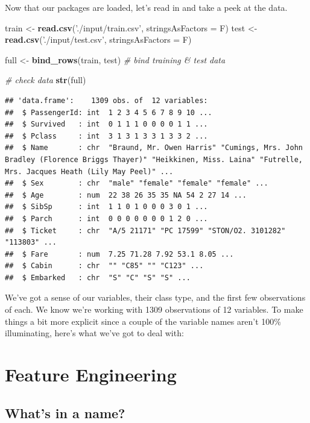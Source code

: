 \documentclass[]{book}
\newenvironment{Shaded}{\begin{snugshade}}{\end{snugshade}}
\newcommand{\KeywordTok}[1]{\textcolor[rgb]{0.13,0.29,0.53}{\textbf{#1}}}
\newcommand{\DataTypeTok}[1]{\textcolor[rgb]{0.13,0.29,0.53}{#1}}
\newcommand{\StringTok}[1]{\textcolor[rgb]{0.31,0.60,0.02}{#1}}
\newcommand{\CommentTok}[1]{\textcolor[rgb]{0.56,0.35,0.01}{\textit{#1}}}
\newcommand{\NormalTok}[1]{#1}
\theoremstyle{definition}
\theoremstyle{definition}
\theoremstyle{definition}
\theoremstyle{remark}
\begin{document}
Now that our packages are loaded, let's read in and take a peek at the
data.

\begin{Shaded}
\begin{Highlighting}[]
\NormalTok{train <-}\StringTok{ }\KeywordTok{read.csv}\NormalTok{(}\StringTok{'./input/train.csv'}\NormalTok{, }\DataTypeTok{stringsAsFactors =}\NormalTok{ F)}
\NormalTok{test  <-}\StringTok{ }\KeywordTok{read.csv}\NormalTok{(}\StringTok{'./input/test.csv'}\NormalTok{, }\DataTypeTok{stringsAsFactors =}\NormalTok{ F)}

\NormalTok{full  <-}\StringTok{ }\KeywordTok{bind_rows}\NormalTok{(train, test) }\CommentTok{# bind training & test data}

\CommentTok{# check data}
\KeywordTok{str}\NormalTok{(full)}
\end{Highlighting}
\end{Shaded}

\begin{verbatim}
## 'data.frame':    1309 obs. of  12 variables:
##  $ PassengerId: int  1 2 3 4 5 6 7 8 9 10 ...
##  $ Survived   : int  0 1 1 1 0 0 0 0 1 1 ...
##  $ Pclass     : int  3 1 3 1 3 3 1 3 3 2 ...
##  $ Name       : chr  "Braund, Mr. Owen Harris" "Cumings, Mrs. John Bradley (Florence Briggs Thayer)" "Heikkinen, Miss. Laina" "Futrelle, Mrs. Jacques Heath (Lily May Peel)" ...
##  $ Sex        : chr  "male" "female" "female" "female" ...
##  $ Age        : num  22 38 26 35 35 NA 54 2 27 14 ...
##  $ SibSp      : int  1 1 0 1 0 0 0 3 0 1 ...
##  $ Parch      : int  0 0 0 0 0 0 0 1 2 0 ...
##  $ Ticket     : chr  "A/5 21171" "PC 17599" "STON/O2. 3101282" "113803" ...
##  $ Fare       : num  7.25 71.28 7.92 53.1 8.05 ...
##  $ Cabin      : chr  "" "C85" "" "C123" ...
##  $ Embarked   : chr  "S" "C" "S" "S" ...
\end{verbatim}

We've got a sense of our variables, their class type, and the first few
observations of each. We know we're working with 1309 observations of 12
variables. To make things a bit more explicit since a couple of the
variable names aren't 100\% illuminating, here's what we've got to deal
with:

\section{Feature Engineering}\label{feature-engineering}

\subsection{What's in a name?}\label{whats-in-a-name}
\end{document}
